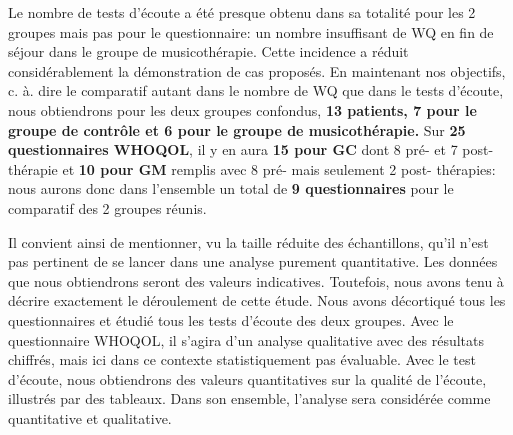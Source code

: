      Le nombre de tests d'écoute a été presque obtenu dans sa totalité pour les 2 groupes mais 
     pas 
     pour le questionnaire: un nombre insuffisant  de WQ en fin de 
     séjour dans le groupe de musicothérapie.
     Cette  incidence a réduit considérablement la démonstration de cas proposés.
     En maintenant nos objectifs, c. à. dire  le comparatif autant  dans le nombre de WQ que dans le  tests 
      d'écoute, 
     nous obtiendrons pour  les deux groupes confondus, \textbf{13 patients, 7 pour le groupe de contrôle 
     et 
     	6 pour 
     	le groupe de musicothérapie.}
     Sur \textbf{25 questionnaires WHOQOL}, il y en aura  \textbf{15 pour GC} dont 8 pré-
     et 7 post-thérapie et  \textbf{10 pour GM} remplis
     avec 8  pré- mais seulement 2
     post- thérapies:  nous aurons donc dans l'ensemble un total de \textbf{9 questionnaires} pour le
     comparatif des 2 groupes réunis.
   
   
   
   Il convient ainsi de mentionner, vu la taille réduite des échantillons, qu'il n'est pas
   pertinent de se lancer dans une analyse purement
   quantitative.
   Les données que nous obtiendrons seront des valeurs indicatives.
   Toutefois, nous avons tenu à décrire exactement le déroulement de cette étude. Nous avons 
   décortiqué 
   tous les questionnaires et étudié tous les tests d'écoute des deux groupes.
   Avec le questionnaire 
   WHOQOL,  il  s'agira d'un analyse qualitative avec des résultats chiffrés, mais ici dans ce contexte
   statistiquement pas évaluable. 
   Avec le test d'écoute, nous obtiendrons des valeurs quantitatives sur la qualité de l'écoute, illustrés 
   par 
   des tableaux.
   Dans son ensemble, l'analyse sera considérée comme quantitative  et qualitative.
   
   
   
